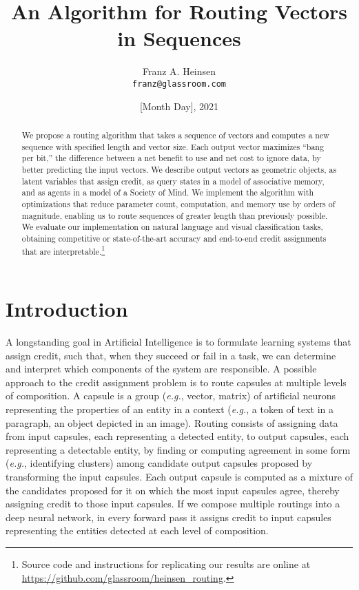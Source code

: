 \documentclass[11pt,a4paper]{article}
\title{	An Algorithm for Routing Vectors in Sequences }
\author{Franz A. Heinsen \\
{\tt franz@glassroom.com} \\ }
\date{[Month Day], 2021}
\begin{document}
\maketitle

\begin{abstract}
We propose a routing algorithm that takes a sequence of vectors and computes a new sequence with specified length and vector size. Each output vector maximizes ``bang per bit,'' the difference between a net benefit to use and net cost to ignore data, by better predicting the input vectors. We describe output vectors as geometric objects, as latent variables that assign credit, as query states in a model of associative memory, and as agents in a model of a Society of Mind. We implement the algorithm with optimizations that reduce parameter count, computation, and memory use by orders of magnitude, enabling us to route sequences of greater length than previously possible. We evaluate our implementation on natural language and visual classification tasks, obtaining competitive or state-of-the-art accuracy and end-to-end credit assignments that are interpretable.\footnote{Source code and instructions for replicating our results are online at \href{https://github.com/glassroom/heinsen_routing}{https://github.com/glassroom/heinsen\_routing}.}
\end{abstract}


\section{Introduction}\label{sec:introduction}

A longstanding goal in Artificial Intelligence is to formulate learning systems that assign credit, such that, when they succeed or fail in a task, we can determine and interpret which components of the system are responsible. A possible approach to the credit assignment problem is to route capsules at multiple levels of composition. A capsule is a group ({\em e.g.}, vector, matrix) of artificial neurons representing the properties of an entity in a context ({\em e.g.}, a token of text in a paragraph, an object depicted in an image). Routing consists of assigning data from input capsules, each representing a detected entity, to output capsules, each representing a detectable entity, by finding or computing agreement in some form ({\em e.g.}, identifying clusters) among candidate output capsules proposed by transforming the input capsules. Each output capsule is computed as a mixture of the candidates proposed for it on which the most input capsules agree, thereby assigning credit to those input capsules. If we compose multiple routings into a deep neural network, in every forward pass it assigns credit to input capsules representing the entities detected at each level of composition.
\end{document}
